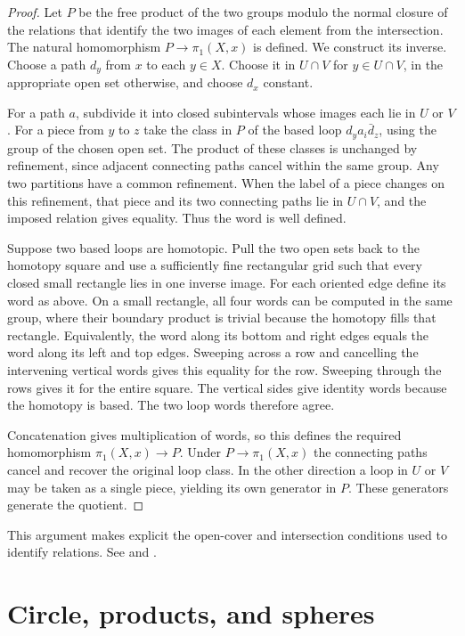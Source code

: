 \documentclass[11pt,oneside,openany]{book}
\theoremstyle{plain}
\theoremstyle{definition}
\theoremstyle{remark}
\begin{document}
\begin{proof}
Let \(P\) be the free product of the two groups modulo the
normal closure of the relations that identify the two images
of each element from the intersection. The natural
homomorphism \(P\to\pi_1(X,x)\) is defined. We construct its
inverse. Choose a path \(d_y\) from \(x\) to each \(y\in X\).
Choose it in \(U\cap V\) for \(y\in U\cap V\), in the appropriate
open set otherwise, and choose \(d_x\) constant.

For a path \(a\), subdivide it into closed subintervals whose
images each lie in \(U\) or \(V\). For a piece from \(y\) to
\(z\) take the class in \(P\) of the based loop \(d_y a_i\bar
d_z\), using the group of the chosen open set. The product of
these classes is unchanged by refinement, since adjacent
connecting paths cancel within the same group. Any two
partitions have a common refinement. When the label of a
piece changes on this refinement, that piece and its two
connecting paths lie in \(U\cap V\), and the imposed relation
gives equality. Thus the word is well defined.

Suppose two based loops are homotopic. Pull the two open sets
back to the homotopy square and use a sufficiently fine
rectangular grid such that every closed small rectangle lies
in one inverse image. For each oriented edge define its word
as above. On a small rectangle, all four words can be computed
in the same group, where their boundary product is trivial
because the homotopy fills that rectangle. Equivalently, the
word along its bottom and right edges equals the word along
its left and top edges. Sweeping across a row and cancelling
the intervening vertical words gives this equality for the
row. Sweeping through the rows gives it for the entire square.
The vertical sides give identity words because the homotopy
is based. The two loop words therefore agree.

Concatenation gives multiplication of words, so this defines
the required homomorphism \(\pi_1(X,x)\to P\). Under
\(P\to\pi_1(X,x)\) the connecting paths cancel and recover the
original loop class. In the other direction a loop in \(U\)
or \(V\) may be taken as a single piece, yielding its own
generator in \(P\). These generators generate the quotient.
\end{proof}

This argument makes explicit the open-cover and intersection
conditions used to identify relations. See \cite[Section 1.2]{Hatcher}
and \cite[Sections 70--71]{MT}.

\section{Circle, products, and spheres}\label{p202:T02}
\end{document}
